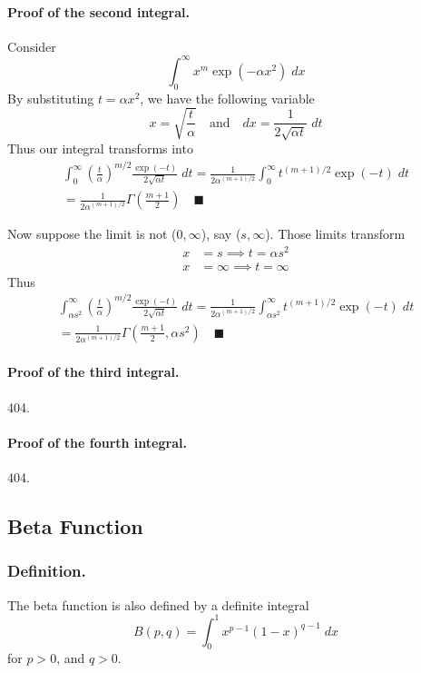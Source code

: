 \documentclass[../../main.tex]{subfiles}
\begin{document}
\paragraph{Proof of the second integral.} Consider 
\begin{equation*}
    \int_{0}^{\infty}x^m \exp\left(-\alpha x^2\right)\; dx
\end{equation*}
By substituting $t=\alpha x^2$, we have the following variable
\begin{equation*}
    x=\sqrt{\frac{t}{\alpha}}\quad\text{and}\quad dx=\frac{1}{2\sqrt{\alpha t}}\;dt
\end{equation*}
Thus our integral transforms into 
\begin{multline*}
    \int_{0}^{\infty}\left(\frac{t}{\alpha}\right)^{m/2} \frac{\exp (-t)}{2\sqrt{\alpha t}}\; dt=\frac{1}{2\alpha^{(m+1)/2}} \int_{0}^{\infty} t^{(m+1)/2}\exp(-t)\;dt \\
    =\frac{1}{2\alpha^{(m+1)/2} }\Gamma\left(\frac{m+1}{2}\right)\quad \blacksquare
\end{multline*}

Now suppose the limit is not ($0,\infty$), say  ($s,\infty$). Those limits transform
\begin{align*}
    x&=s\implies t=\alpha s^2\\
    x&=\infty\implies t=\infty
\end{align*}
Thus
\begin{multline*}
    \int_{\alpha s^2}^{\infty}\left(\frac{t}{\alpha}\right)^{m/2} \frac{\exp (-t)}{2\sqrt{\alpha t}}\; dt=\frac{1}{2\alpha^{(m+1)/2}} \int_{\alpha s^2}^{\infty} t^{(m+1)/2}\exp(-t)\;dt \\
    =\frac{1}{2\alpha^{(m+1)/2} } \Gamma\left(\frac{m+1}{2}, \alpha s^2\right)\quad \blacksquare
\end{multline*}

\paragraph{Proof of the third integral.} 404.
\paragraph{Proof of the fourth integral.} 404. 


\subsection{Beta Function}
\subsubsection{Definition.} The beta function is also defined by a definite integral
\begin{equation*}
    B(p,q)=\int_{0}^{1}x^{p-1} (1-x)^{q-1}\;dx 
\end{equation*}
for $p > 0$, and $q > 0$. 
\end{document}
